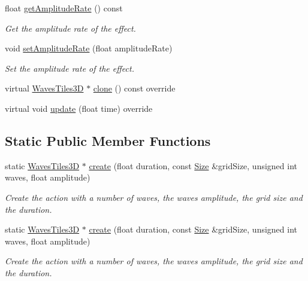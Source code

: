 \begin{DoxyCompactItemize}
float \hyperlink{classWavesTiles3D_aac8edc171d3943248464c3fae596db1c}{get\+Amplitude\+Rate} () const
\begin{DoxyCompactList}\small\item\em Get the amplitude rate of the effect. \end{DoxyCompactList}\item 
void \hyperlink{classWavesTiles3D_a5c31881ea4cee059ce9ea49f1c8acb76}{set\+Amplitude\+Rate} (float amplitude\+Rate)
\begin{DoxyCompactList}\small\item\em Set the amplitude rate of the effect. \end{DoxyCompactList}\item 
virtual \hyperlink{classWavesTiles3D}{Waves\+Tiles3D} $\ast$ \hyperlink{classWavesTiles3D_a7c7d226d6bf5f33041a4c54d062757b8}{clone} () const override
\item 
virtual void \hyperlink{classWavesTiles3D_a7418270658659552df80826ed4904ec6}{update} (float time) override
\end{DoxyCompactItemize}
\subsection*{Static Public Member Functions}
\begin{DoxyCompactItemize}
\item 
static \hyperlink{classWavesTiles3D}{Waves\+Tiles3D} $\ast$ \hyperlink{classWavesTiles3D_a081f6fc50d4364c1c3a77ac22ed54108}{create} (float duration, const \hyperlink{classSize}{Size} \&grid\+Size, unsigned int waves, float amplitude)
\begin{DoxyCompactList}\small\item\em Create the action with a number of waves, the waves amplitude, the grid size and the duration. \end{DoxyCompactList}\item 
static \hyperlink{classWavesTiles3D}{Waves\+Tiles3D} $\ast$ \hyperlink{classWavesTiles3D_a27c5b2c4db6fb627d7513a2117e65db1}{create} (float duration, const \hyperlink{classSize}{Size} \&grid\+Size, unsigned int waves, float amplitude)
\begin{DoxyCompactList}\small\item\em Create the action with a number of waves, the waves amplitude, the grid size and the duration. \end{DoxyCompactList}\end{DoxyCompactItemize}
